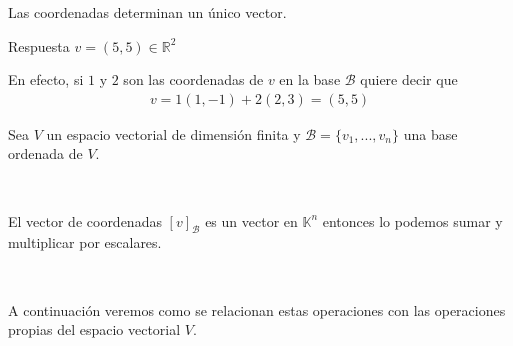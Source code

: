 \documentclass[handout]{beamer} %
\newcommand{\R}{\mathbb R}
\newcommand{\K}{\mathbb K}
\newcommand{\cB}{\mathcal{B}}
\begin{document}
    
        \begin{frame}
        
        \begin{observacion}
        Las coordenadas determinan un único vector.
        \end{observacion}\pause
        
        \pause
        \begin{block}{Respuesta} \pause
        $v=(5,5)\in\R^2$
        \end{block}
        
        En efecto, si $1$ y $2$ son las coordenadas de $v$ en la base $\cB$ quiere decir que 
        \begin{align*}
        v=1(1,-1)+2(2,3)=(5,5)
        \end{align*}
        \end{frame}
        
    
        
        
        \begin{frame}
        Sea $V$ un espacio vectorial de dimensión finita y $\cB=\{v_1, ..., v_n\}$ una base ordenada de $V$.\pause
        
        \
        
        El vector de coordenadas $[v]_\cB$ es un vector en $\K^n$ entonces lo podemos sumar y multiplicar por escalares. \pause
        
        \
        
        A continuación veremos como se relacionan estas operaciones con las operaciones propias del espacio vectorial $V$.
        \end{frame}
        
\end{document}

